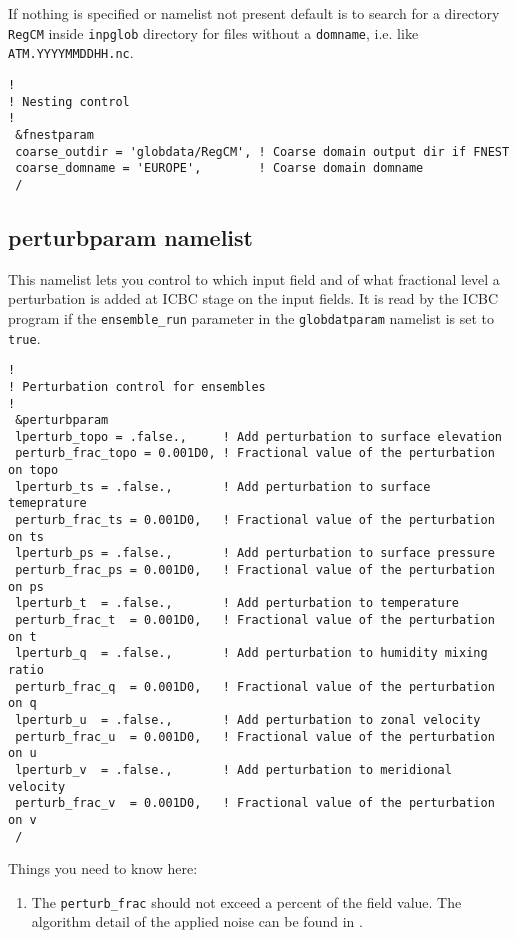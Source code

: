 If nothing is specified or namelist not present default is to search for
a directory \verb=RegCM= inside \verb=inpglob= directory for files without
a \verb=domname=, i.e. like \verb=ATM.YYYYMMDDHH.nc=.

{\footnotesize
\begin{Verbatim}
!
! Nesting control
!
 &fnestparam
 coarse_outdir = 'globdata/RegCM', ! Coarse domain output dir if FNEST
 coarse_domname = 'EUROPE',        ! Coarse domain domname
 /
\end{Verbatim}
}

\subsection{perturbparam namelist}

This namelist lets you control to which input field and of what fractional
level a perturbation is added at ICBC stage on the input fields.
It is read by the ICBC program if the \verb=ensemble_run= parameter in the
\verb=globdatparam= namelist is set to \verb=true=.

{\footnotesize
\begin{Verbatim}
!
! Perturbation control for ensembles
!
 &perturbparam
 lperturb_topo = .false.,     ! Add perturbation to surface elevation
 perturb_frac_topo = 0.001D0, ! Fractional value of the perturbation on topo
 lperturb_ts = .false.,       ! Add perturbation to surface temeprature
 perturb_frac_ts = 0.001D0,   ! Fractional value of the perturbation on ts
 lperturb_ps = .false.,       ! Add perturbation to surface pressure
 perturb_frac_ps = 0.001D0,   ! Fractional value of the perturbation on ps
 lperturb_t  = .false.,       ! Add perturbation to temperature
 perturb_frac_t  = 0.001D0,   ! Fractional value of the perturbation on t
 lperturb_q  = .false.,       ! Add perturbation to humidity mixing ratio
 perturb_frac_q  = 0.001D0,   ! Fractional value of the perturbation on q
 lperturb_u  = .false.,       ! Add perturbation to zonal velocity
 perturb_frac_u  = 0.001D0,   ! Fractional value of the perturbation on u
 lperturb_v  = .false.,       ! Add perturbation to meridional velocity
 perturb_frac_v  = 0.001D0,   ! Fractional value of the perturbation on v
 /
\end{Verbatim}
}

Things you need to know here:

\begin{enumerate}
\item The \verb=perturb_frac= should not exceed a percent of the field value.
The algorithm detail of the applied noise can be found in \cite{tao_ense}.
\end{enumerate}

